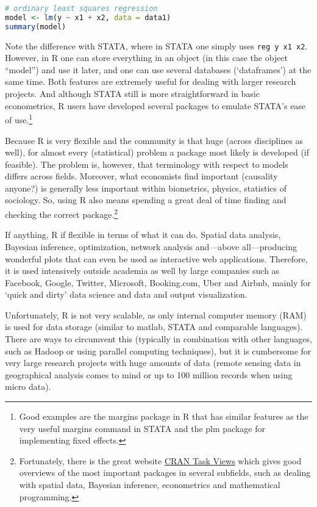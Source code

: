 \documentclass[fleqn,10pt]{SelfArx} %
\begin{document}
\begin{lstlisting}[language=R]
# ordinary least squares regression
model <- lm(y ~ x1 + x2, data = data1)
summary(model)
\end{lstlisting}
Note the difference with STATA, where in STATA one simply uses \texttt{reg y x1 x2}. However, in R one can store everything in an object (in this case the object ``model'') and use it later, and one can use several databases (`dataframes') at the same time. Both features are extremely useful for dealing with larger research projects. And although STATA still is more straightforward in basic econometrics, R users have developed several packages to emulate STATA's ease of use.\footnote{Good examples are the margins package in R that has similar features as the very useful margins command in STATA and the plm package for implementing fixed effects.}

Because R is very flexible and the community is that huge (across disciplines as well), for almost every (statistical) problem a package most likely is developed (if feasible). The problem is, however, that terminology with respect to models differs across fields. Moreover, what economists find important (causality anyone?) is generally less important within biometrics, physics, statistics of sociology. So, using R also means spending a great deal of time finding and checking the correct package.\footnote{Fortunately, there is the great website \href{https://cran.r-project.org/web/views/}{CRAN Task Views} which gives good overviews of the most important packages in several subfields, such as dealing with spatial data, Bayesian inference, econometrics and mathematical programming.}

If anything, R if flexible in terms of what it can do. Spatial data analysis, Bayesian inference, optimization, network analysis and---above all---producing wonderful plots that can even be used as interactive web applications. Therefore, it is used intensively outside academia as well by large companies such as Facebook, Google, Twitter, Microsoft, Booking.com, Uber and Airbnb, mainly for `quick and dirty' data science and data and output visualization.

Unfortunately, R is not very scalable, as only internal computer memory (RAM) is used for data storage (similar to matlab, STATA and comparable languages). There are ways to circumvent this (typically in combination with other languages, such as Hadoop or using parallel computing techniques), but it is cumbersome for very large research projects with huge amounts of data (remote sensing data in geographical analysis comes to mind or up to 100 million records when using micro data).
\end{document}
